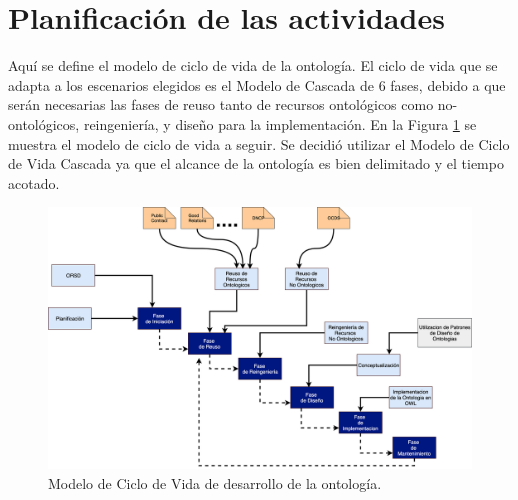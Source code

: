 \section{Planificación de las actividades}

Aquí se define el modelo de ciclo de vida de la ontología. El ciclo de vida que se adapta a los escenarios elegidos es el Modelo de Cascada de 6 fases, debido a que serán necesarias las fases de reuso tanto de recursos ontológicos como no-ontológicos, reingeniería, y diseño para la implementación. En la Figura \ref{img:secuenciaDeDesarrollo} se muestra el modelo de ciclo de vida a seguir. Se decidió utilizar el Modelo de Ciclo de Vida Cascada ya que el alcance de la ontología es bien delimitado y el tiempo acotado.

\begin{figure}[ht!]
    \centering
    \includegraphics[width=150mm]{figuras/Diagramas-GraficodeSecuenciasDesarrollo.png}
    \caption{Modelo de Ciclo de Vida de desarrollo de la ontología.}
    \label{img:secuenciaDeDesarrollo}
\end{figure}

